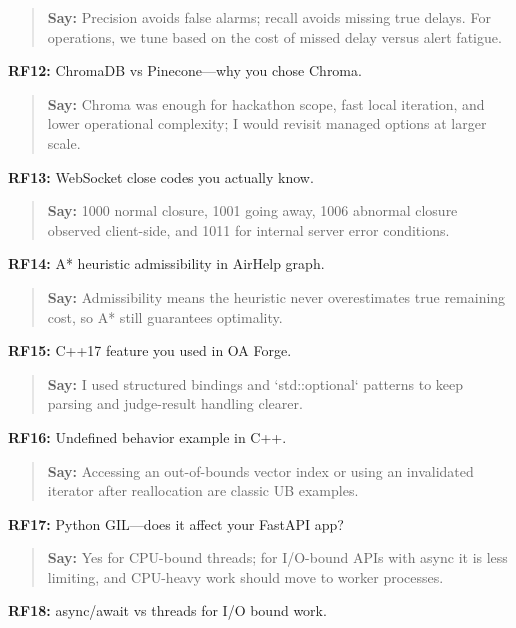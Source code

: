 \documentclass[9pt,a4paper]{article}
\begin{document}
\begin{quote}\small\textbf{Say:} Precision avoids false alarms; recall avoids missing true delays. For operations, we tune based on the cost of missed delay versus alert fatigue.\end{quote}
\vspace{2mm}
\textbf{RF12:} ChromaDB vs Pinecone---why you chose Chroma.

\begin{quote}\small\textbf{Say:} Chroma was enough for hackathon scope, fast local iteration, and lower operational complexity; I would revisit managed options at larger scale.\end{quote}
\vspace{2mm}
\textbf{RF13:} WebSocket close codes you actually know.

\begin{quote}\small\textbf{Say:} 1000 normal closure, 1001 going away, 1006 abnormal closure observed client-side, and 1011 for internal server error conditions.\end{quote}
\vspace{2mm}
\textbf{RF14:} A* heuristic admissibility in AirHelp graph.

\begin{quote}\small\textbf{Say:} Admissibility means the heuristic never overestimates true remaining cost, so A* still guarantees optimality.\end{quote}
\vspace{2mm}
\textbf{RF15:} C++17 feature you used in OA Forge.

\begin{quote}\small\textbf{Say:} I used structured bindings and `std::optional` patterns to keep parsing and judge-result handling clearer.\end{quote}
\vspace{2mm}
\textbf{RF16:} Undefined behavior example in C++.

\begin{quote}\small\textbf{Say:} Accessing an out-of-bounds vector index or using an invalidated iterator after reallocation are classic UB examples.\end{quote}
\vspace{2mm}
\textbf{RF17:} Python GIL---does it affect your FastAPI app?

\begin{quote}\small\textbf{Say:} Yes for CPU-bound threads; for I/O-bound APIs with async it is less limiting, and CPU-heavy work should move to worker processes.\end{quote}
\vspace{2mm}
\textbf{RF18:} async/await vs threads for I/O bound work.
\end{document}
